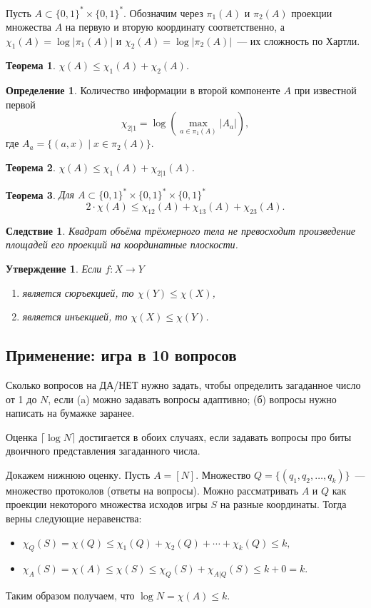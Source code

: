 \documentclass[12pt]{article}
\newcommand{\bits}{\{0,1\}}
\newcommand{\bitstr}{\bits^*}
\newcommand{\seqn}[2]{{#1}_1,{#1}_2,\dotsc,{#1}_{#2}}
\theoremstyle{definition}
\newtheorem{definition}{Определение}[section]
\theoremstyle{plain}
\newtheorem{theorem}{Теорема}[section]
\newtheorem{statement}{Утверждение}[section]
\newtheorem{corollary}{Следствие}[section]
\theoremstyle{remark}
\begin{document}
Пусть \(A\subset\bitstr\times\bitstr\). Обозначим через \(\pi_1(A)\) и \(\pi_2(A)\) проекции множества \(A\) на первую и вторую координату соответственно, а \(\chi_1(A) = \log|\pi_1(A)|\) и \(\chi_2(A) = \log|\pi_2(A)|\)~--- их сложность по Хартли.

\begin{theorem} 
\(\chi(A) \le \chi_1(A) + \chi_2(A)\).
\end{theorem}

\begin{definition}
Количество информации в второй компоненте \(A\) при известной первой
\[\chi_{2|1} = \log\left(\max_{a\in\pi_1(A)} |A_a|\right),\]
где $A_a = \{(a, x) \mid x\in \pi_2(A)\}$.
\end{definition}

\begin{theorem} 
\(\chi(A) \le \chi_1(A) + \chi_{2|1}(A)\).
\end{theorem}

\begin{theorem}\label{thm:volume}
Для \(A\subset\bitstr\times\bitstr\times\bitstr\)
\[2\cdot\chi(A) \le \chi_{12}(A) + \chi_{13}(A) + \chi_{23}(A).\]
\end{theorem}
\begin{corollary}
Квадрат объёма трёхмерного тела не превосходит произведение площадей его проекций на координатные плоскости.
\end{corollary}

\begin{statement}
Если \(f: X\to Y\)
\begin{enumerate}
    \item является сюръекцией, то \(\chi(Y)\le \chi(X)\),
    \item является инъекцией, то \(\chi(X)\le \chi(Y)\).
\end{enumerate}
\end{statement}

\subsection{Применение: игра в 10 вопросов}
Сколько вопросов на ДА/НЕТ нужно задать, чтобы определить загаданное число от 1 до \(N\), если (a) можно задавать вопросы адаптивно; (б) вопросы нужно написать на бумажке заранее.

Оценка \(\lceil\log N\rceil \) достигается в обоих случаях, если задавать вопросы про биты двоичного представления загаданного числа.

Докажем нижнюю оценку. Пусть \(A=[N]\). Множество \(Q = \{(\seqn{q}{k})\}\)~--- множество протоколов (ответы на вопросы). 
Можно рассматривать \(A\) и \(Q\) как проекции некоторого множества исходов игры \(S\) на разные координаты. Тогда верны следующие неравенства:
\begin{itemize}
\item \( \chi_Q(S) = \chi(Q) \le \chi_1(Q) + \chi_2(Q) + \dotsb + \chi_k(Q) \le k, \)
\item \( \chi_A(S) = \chi(A) \le \chi(S) \le \chi_Q(S) + \chi_{A|Q}(S) \le k + 0 = k. \)
\end{itemize}
Таким образом получаем, что \(\log N = \chi(A) \le k\).
\end{document}
